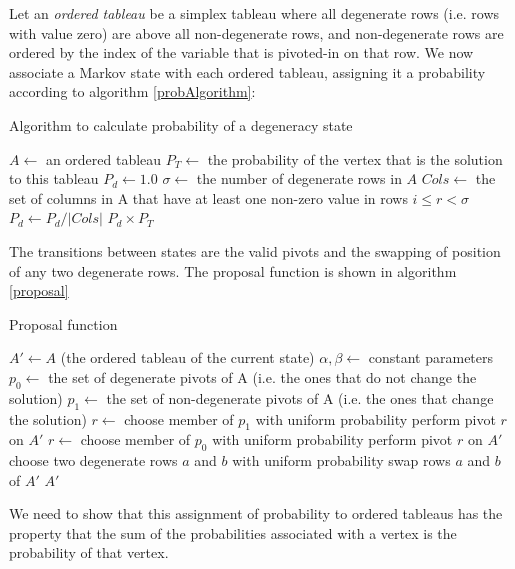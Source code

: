 \documentclass{article}
\begin{document}
Let an \textit{ordered tableau} be a simplex tableau where all degenerate rows (i.e. rows with value zero) are above all non-degenerate rows, and non-degenerate rows are ordered by the index of the variable that is pivoted-in on that row. We now associate a Markov state with each ordered tableau, assigning it a probability according to algorithm \ref{probAlgorithm}:

\begin{algorithm}
\caption{Algorithm to calculate probability of a degeneracy state}
\label{probAlgorithm}
\begin{algorithmic}
\State $A \leftarrow$ an ordered tableau
\State $P_T \leftarrow$ the probability of the vertex that is the solution to this tableau
\State $P_d \leftarrow 1.0$
\State $\sigma \leftarrow$ the number of degenerate rows in $A$
	\State $Cols \leftarrow$ the set of columns in A that have at least one non-zero value in rows $i \le r < \sigma$
	\State $P_d \leftarrow P_d/|Cols|$
\EndFor
\State \Return $P_d \times P_T$
\end{algorithmic}
\end{algorithm}

The transitions between states are the valid pivots and the swapping of position of any two degenerate rows. The proposal function is shown in algorithm \ref{proposal}

\begin{algorithm}
\caption{Proposal function}
\label{proposal}
\begin{algorithmic}
\State $A' \leftarrow A$ (the ordered tableau of the current state)
\State $\alpha, \beta \leftarrow$ constant parameters
\State $p_0 \leftarrow$ the set of degenerate pivots of A (i.e. the ones that do not change the solution)
\State $p_1 \leftarrow$ the set of non-degenerate pivots of A (i.e. the ones that change the solution)
  \State $r \leftarrow$ choose member of $p_1$ with uniform probability
  \State perform pivot $r$ on $A'$
  \State $r \leftarrow$ choose member of $p_0$ with uniform probability
  \State perform pivot $r$ on $A'$
\Else
  \State choose two degenerate rows $a$ and $b$ with uniform probability
  \State swap rows $a$ and $b$ of $A'$ 
\EndIf
\State \Return $A'$
\EndFunction
\end{algorithmic}
\end{algorithm}

We need to show that this assignment of probability to ordered tableaus has the property that the sum of the probabilities associated with a vertex is the probability of that vertex.
\end{document}
